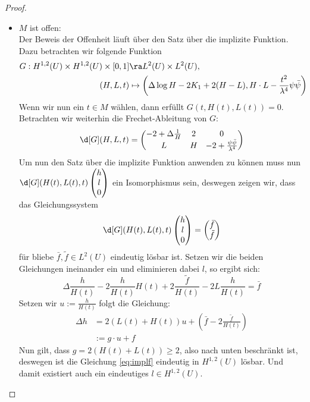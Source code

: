 \begin{proof}
\begin{itemize}
    \item $M$ ist offen: \\
      Der Beweis der Offenheit läuft über den Satz über die implizite Funktion. Dazu betrachten wir folgende Funktion
      \begin{align*}
	G : H^{1,2}(U) \times H^{1,2}(U) \times [0,1] & \ra L^2(U) \times L^2(U), \\
	(H, L, t) & \mapsto \left ( \Delta \log H -2 K_1 + 2(H - L), H \cdot L - \frac{t^2}{\lambda^4} \psi \bar \psi \right )
      \end{align*}
      Wenn wir nun ein $t \in M$ wählen, dann erfüllt $G(t, H(t), L(t)) = 0$. Betrachten wir weiterhin die Frechet-Ableitung von $G$:
      \[
      \d[G](H, L, t) = \begin{pmatrix} -2 + \Delta \frac1H & 2 & 0 \\ L & H & -2 + \frac{\psi \bar \psi}{\lambda^4} \end{pmatrix}
      \]
      Um nun den Satz über die implizite Funktion anwenden zu können muss nun $\d[G](H(t), L(t), t) \begin{pmatrix}h\\l\\0 \end{pmatrix}$ ein Isomorphismus sein, deswegen zeigen wir, dass das Gleichungssystem
	\[
	\d[G](H(t), L(t), t) \begin{pmatrix}h\\l\\0 \end{pmatrix} = \begin{pmatrix} \bar f\\ \tilde f\end{pmatrix}
	\]
	für bliebe $\bar f, \tilde f \in L^2(U)$ eindeutig lösbar ist. Setzen wir die beiden Gleichungen ineinander ein und eliminieren dabei $l$, so ergibt sich:
	\[
	\Delta \frac{h}{H(t)} -2 \frac{h}{H(t)} H(t) + 2 \frac{\tilde f}{H(t)} - 2L \frac{h}{H(t)} = \bar f
	\]
	Setzen wir $u := \frac{h}{H(t)}$ folgt die Gleichung:
	\begin{align*}
	  \Delta h & = 2(L(t) + H(t)) u + \left ( \bar f - 2 \frac{\tilde f}{H(t)} \right ) \\
	  & := g \cdot u + f \tag{\ast} \label{eq:implf}
	\end{align*}
	Nun gilt, dass $g = 2 (H(t) + L(t)) \geq 2$, also nach unten beschränkt ist, deswegen ist die Gleichung \eqref{eq:implf} eindeutig in $H^{1,2}(U)$ lösbar. Und damit existiert auch ein eindeutiges $l \in H^{1,2}(U)$. \\

\end{itemize}
\end{proof}
